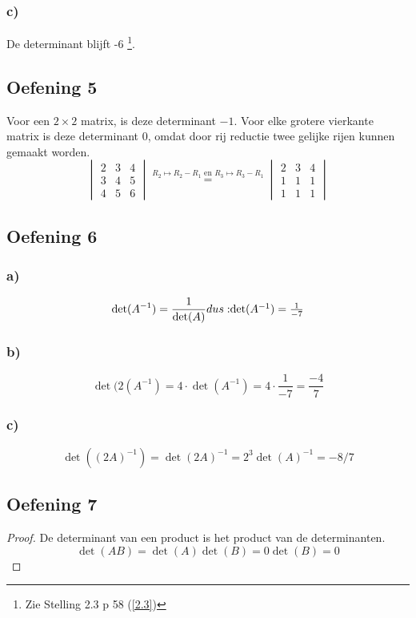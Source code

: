 \documentclass[lineaire_algebra_oplossingen.tex]{subfiles}
\begin{document}
\subsubsection*{c)}
De determinant blijft -6 \footnote{Zie Stelling 2.3 p 58 (\ref{2.3})}.
\subsection{Oefening 5}
Voor een $2\times2$ matrix, is deze determinant $-1$.
Voor elke grotere vierkante matrix is deze determinant $0$, omdat door rij reductie twee gelijke rijen kunnen gemaakt worden.
\[
\begin{vmatrix}
2 & 3 & 4\\
3 & 4 & 5\\
4 & 5 & 6
\end{vmatrix}
\overset{R_2 \longmapsto R_2-R_1 \text{ en } R_3 \longmapsto R_3 - R_1}{=}
\begin{vmatrix}
2 & 3 & 4\\
1 & 1 & 1\\
1 & 1 & 1
\end{vmatrix}
\]
\subsection{Oefening 6}
\subsubsection*{a)}
\[
\det(A^{-1}) = \frac{1}{\det(A)} $$
dus:
$$
\det(A^{-1}) = \frac{1}{-7} 
\]
\subsubsection*{b)}
$$ \det(2(A^{-1}) = 4\cdot \det(A^{-1}) = 4 \cdot \frac{1}{-7} = \frac{-4}{7}
$$
\subsubsection*{c)}
\[ \det((2A)^{-1}) = \det(2A)^{-1} = 2^{3}\det(A)^{-1} = -8/7\]
\subsection{Oefening 7}
\begin{proof}
De determinant van een product is het product van de determinanten.
\[
\det(AB) = \det(A) \det(B) = 0 \det(B) = 0 
\]
\end{proof}
\end{document}
